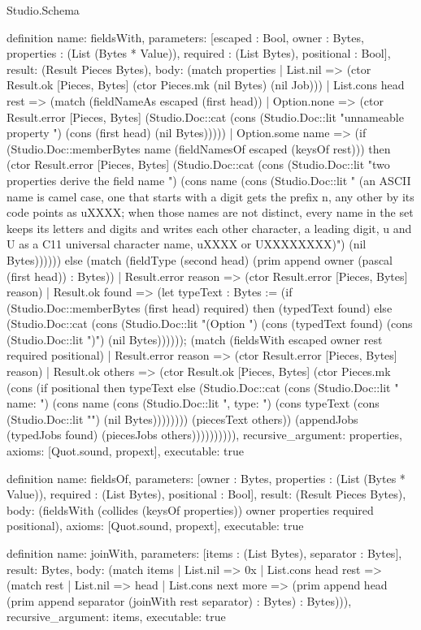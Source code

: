 \begin{lexlean}{Studio.Schema}
\begin{semanticmodule}
definition{
  name: fieldsWith,
  parameters: [escaped : Bool, owner : Bytes, properties : (List (Bytes * Value)), required : (List Bytes), positional : Bool],
  result: (Result Pieces Bytes),
  body: (match properties
    | List.nil => (ctor Result.ok [Pieces, Bytes] (ctor Pieces.mk (nil Bytes) (nil Job)))
    | List.cons head rest => (match (fieldNameAs escaped (first head))
      | Option.none => (ctor Result.error [Pieces, Bytes] (Studio.Doc::cat (cons (Studio.Doc::lit "unnameable property ") (cons (first head) (nil Bytes)))))
      | Option.some name => (if (Studio.Doc::memberBytes name (fieldNamesOf escaped (keysOf rest))) then (ctor Result.error [Pieces, Bytes] (Studio.Doc::cat (cons (Studio.Doc::lit "two properties derive the field name ") (cons name (cons (Studio.Doc::lit " (an ASCII name is camel case, one that starts with a digit gets the prefix n, any other by its code points as uXXXX; when those names are not distinct, every name in the set keeps its letters and digits and writes each other character, a leading digit, u and U as a C11 universal character name, uXXXX or UXXXXXXXX)") (nil Bytes)))))) else (match (fieldType (second head) (prim append owner (pascal (first head)) : Bytes))
      | Result.error reason => (ctor Result.error [Pieces, Bytes] reason)
      | Result.ok found => (let typeText : Bytes := (if (Studio.Doc::memberBytes (first head) required) then (typedText found) else (Studio.Doc::cat (cons (Studio.Doc::lit "(Option ") (cons (typedText found) (cons (Studio.Doc::lit ")") (nil Bytes)))))); (match (fieldsWith escaped owner rest required positional)
        | Result.error reason => (ctor Result.error [Pieces, Bytes] reason)
        | Result.ok others => (ctor Result.ok [Pieces, Bytes] (ctor Pieces.mk (cons (if positional then typeText else (Studio.Doc::cat (cons (Studio.Doc::lit "    {name: ") (cons name (cons (Studio.Doc::lit ", type: ") (cons typeText (cons (Studio.Doc::lit "}") (nil Bytes)))))))) (piecesText others)) (appendJobs (typedJobs found) (piecesJobs others)))))))))),
  recursive_argument: properties,
  axioms: [Quot.sound, propext],
  executable: true
}

definition{
  name: fieldsOf,
  parameters: [owner : Bytes, properties : (List (Bytes * Value)), required : (List Bytes), positional : Bool],
  result: (Result Pieces Bytes),
  body: (fieldsWith (collides (keysOf properties)) owner properties required positional),
  axioms: [Quot.sound, propext],
  executable: true
}

definition{
  name: joinWith,
  parameters: [items : (List Bytes), separator : Bytes],
  result: Bytes,
  body: (match items
    | List.nil => 0x
    | List.cons head rest => (match rest
      | List.nil => head
      | List.cons next more => (prim append head (prim append separator (joinWith rest separator) : Bytes) : Bytes))),
  recursive_argument: items,
  executable: true
}


\end{semanticmodule}
\end{lexlean}
